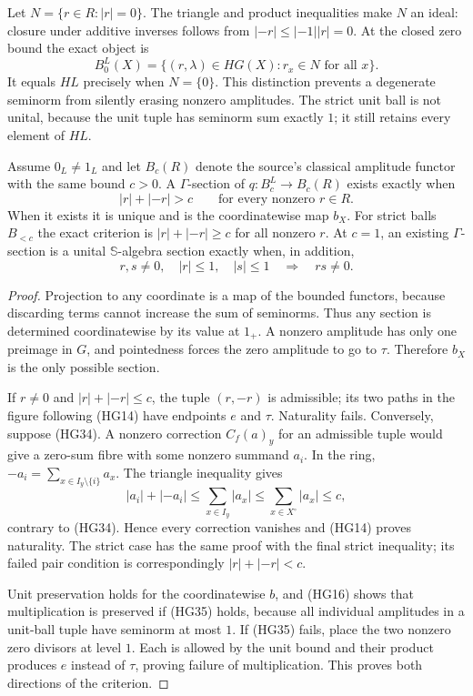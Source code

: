 Let $N=\{r\in R:|r|=0\}$.  The triangle and product
inequalities make $N$ an ideal: closure under additive
inverses follows from $|-r|\le|-1||r|=0$.  At the closed
zero bound the exact object is
\begin{equation}\tag{HG28}
 B_0^L(X)=\{(r,\lambda)\in HG(X):r_x\in N\text{ for all }x\}.
\end{equation}
It equals $HL$ precisely when $N=\{0\}$.  This distinction
prevents a degenerate seminorm from silently erasing nonzero
amplitudes.  The strict unit ball is not unital, because the
unit tuple has seminorm sum exactly $1$; it still retains
every element of $HL$.

\begin{theorem}\label{HG:boundedsection}
Assume $0_L\ne1_L$ and let $B_c(R)$ denote the source's
classical amplitude functor with the same bound $c>0$.
A $\Gamma$-section of $q:B_c^L\to B_c(R)$ exists exactly
when
\begin{equation}\tag{HG34}
 |r|+|-r|>c\qquad\text{for every nonzero }r\in R.
\end{equation}
When it exists it is unique and is the coordinatewise map
$b_X$.  For strict balls $B_{<c}$ the exact criterion is
$|r|+|-r|\ge c$ for all nonzero $r$.  At $c=1$, an existing
$\Gamma$-section is a unital $\mathbb S$-algebra section
exactly when, in addition,
\begin{equation}\tag{HG35}
 r,s\ne0,\quad |r|\le1,\quad |s|\le1
             \quad\Longrightarrow\quad rs\ne0.
\end{equation}
\end{theorem}
\begin{proof}
Projection to any coordinate is a map of the bounded functors,
because discarding terms cannot increase the sum of seminorms.
Thus any section is determined coordinatewise by its value
at $1_+$.  A nonzero amplitude has only one preimage in $G$,
and pointedness forces the zero amplitude to go to $\tau$.
Therefore $b_X$ is the only possible section.

If $r\ne0$ and $|r|+|-r|\le c$, the tuple $(r,-r)$ is
admissible; its two paths in the figure following (HG14) have
endpoints $e$ and $\tau$.  Naturality fails.  Conversely,
suppose (HG34).  A nonzero correction $C_f(a)_y$ for an
admissible tuple would give a zero-sum fibre with some nonzero
summand $a_i$.  In the ring,
$-a_i=\sum_{x\in I_y\setminus\{i\}}a_x$.  The triangle
inequality gives
\[
 |a_i|+|-a_i|\le\sum_{x\in I_y}|a_x|
        \le\sum_{x\in X^\circ}|a_x|\le c,
\]
contrary to (HG34).  Hence every correction vanishes and
(HG14) proves naturality.  The strict case has the same
proof with the final strict inequality; its failed pair
condition is correspondingly $|r|+|-r|<c$.

Unit preservation holds for the coordinatewise $b$, and
(HG16) shows that multiplication is preserved if (HG35)
holds, because all individual amplitudes in a unit-ball
tuple have seminorm at most $1$.  If (HG35) fails, place
the two nonzero zero divisors at level $1$.  Each is allowed
by the unit bound and their product produces $e$ instead
of $\tau$, proving failure of multiplication.  This proves
both directions of the criterion.
\end{proof}

